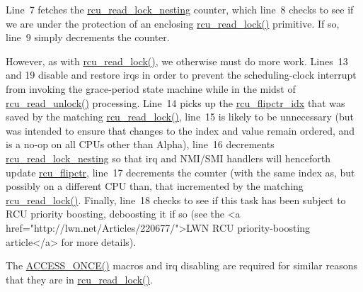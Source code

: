 Line~7 fetches the \url{rcu_read_lock_nesting} counter,
which line~8 checks to see if we are under the protection of an
enclosing \url{rcu_read_lock()} primitive.
If so, line~9 simply decrements the counter.

However, as with \url{rcu_read_lock()}, we otherwise must do
more work.
Lines~13 and 19 disable and restore irqs in order to prevent
the scheduling-clock interrupt from invoking the grace-period state machine 
while in the midst of \url{rcu_read_unlock()} processing.
Line~14 picks up the \url{rcu_flipctr_idx} that was
saved by the matching \url{rcu_read_lock()},
line~15 is likely
to be unnecessary (but was intended to ensure that changes to the index
and value remain ordered, and is a no-op on all CPUs other than Alpha),
line~16
decrements \url{rcu_read_lock_nesting} so that irq and
NMI/SMI handlers will henceforth update \url{rcu_flipctr},
line~17 decrements the counter (with the same index as, but possibly
on a different CPU than, that incremented by the matching
\url{rcu_read_lock()}.
Finally, line~18 checks to see if this task has been subject to
RCU priority boosting, deboosting it if so (see the
<a href="http://lwn.net/Articles/220677/">LWN RCU priority-boosting article</a>
for more details).

The \url{ACCESS_ONCE()} macros and irq disabling
are required for similar reasons that they are in
\url{rcu_read_lock()}.

